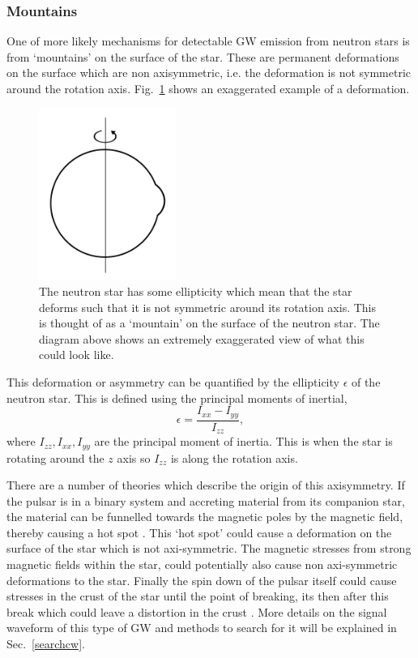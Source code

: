 \subsubsection{Mountains}

One of more likely mechanisms for detectable \ac{GW} emission from neutron stars is from `mountains' on the surface of the star.
These are permanent deformations on the surface which are non axisymmetric, i.e. the deformation is not symmetric around the rotation axis.
Fig.~\ref{intro:source:cw:mountain} shows an exaggerated example of a deformation.
\begin{figure}[h]
	\centering
	\includegraphics[width=0.4\textwidth]{C1_intro/neutron_star_mountain.pdf}
	\caption{The neutron star has some ellipticity which mean that the star deforms such that it is not symmetric around its rotation axis. This is thought of as a `mountain' on the surface of the neutron star. The diagram above shows an extremely exaggerated view of what this could look like.}
	\label{intro:source:cw:mountain}
\end{figure}

This deformation or asymmetry can be quantified by the ellipticity $\epsilon$ of the neutron star.
This is defined using the principal moments of inertial,
\begin{equation}
\label{ellipticity}
\epsilon = \frac{I_{xx}-I_{yy}}{I_{zz}},
\end{equation}
where $I_{zz},I_{xx},I_{yy}$ are the principal moment of inertia.
This is when the star is rotating around the $z$ axis so $I_{zz}$ is along the rotation axis. 

There are a number of theories which describe the origin of this axisymmetry.
If the pulsar is in a binary system and accreting material from its companion star, the material can be funnelled towards the magnetic poles by the magnetic field, thereby causing a hot spot \citep{haskell2015DetectingGravitational}.
This `hot spot' could cause a deformation on the surface of the star which is not axi-symmetric. 
The magnetic stresses from strong magnetic fields within the star, could potentially also cause non axi-symmetric deformations to the star.
Finally the spin down of the pulsar itself could cause stresses in the crust of the star until the point of breaking, its then after this break which could leave a distortion in the crust \citep{becker2009NeutronStars}.
More details on the signal waveform of this type of \ac{GW} and methods to search for it will be explained in Sec.~\ref{searchcw}.
 
